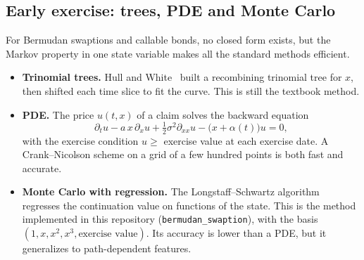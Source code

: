 \documentclass[11pt,a4paper]{article}
\theoremstyle{plain}
\theoremstyle{definition}
\begin{document}
\subsection{Early exercise: trees, PDE and Monte Carlo}
For Bermudan swaptions and callable bonds, no closed form exists, but the Markov property in one state variable makes all the standard methods efficient.
\begin{itemize}
    \item \textbf{Trinomial trees.} Hull and White~\cite{hullwhite94} built a recombining trinomial tree for $x$, then shifted each time slice to fit the curve. This is still the textbook method.
    \item \textbf{PDE.} The price $u(t,x)$ of a claim solves the backward equation
    \begin{equation}
        \partial_tu-a\,x\,\partial_xu+\tfrac12\sigma^2\partial_{xx}u-\bigl(x+\alpha(t)\bigr)u=0,
        \label{eq:pde}
    \end{equation}
    with the exercise condition $u\geq$ exercise value at each exercise date. A Crank--Nicolson scheme on a grid of a few hundred points is both fast and accurate.
    \item \textbf{Monte Carlo with regression.} The Longstaff--Schwartz algorithm~\cite{longstaff} regresses the continuation value on functions of the state. This is the method implemented in this repository (\texttt{bermudan\_swaption}), with the basis $(1,x,x^2,x^3,\text{exercise value})$. Its accuracy is lower than a PDE, but it generalizes to path-dependent features.
\end{itemize}
\end{document}

